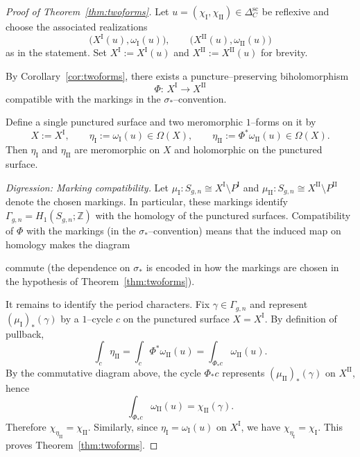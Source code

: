 \documentclass[a4paper,12pt]{amsart}
\newcommand{\Z}{\mathbb{Z}}
\theoremstyle{plain}
\theoremstyle{definition}
\begin{document}
\begin{proof}[Proof of Theorem~\ref{thm:twoforms}]
Let $u=(\chi_{\mathrm{I}},\chi_{\mathrm{II}})\in\Delta_C^{\mathrm{sc}}$ be reflexive and choose the associated realizations
\[
\bigl(X^{\mathrm{I}}(u),\omega_{\mathrm{I}}(u)\bigr),\qquad
\bigl(X^{\mathrm{II}}(u),\omega_{\mathrm{II}}(u)\bigr)
\]
as in the statement. Set $X^{\mathrm{I}}:=X^{\mathrm{I}}(u)$ and $X^{\mathrm{II}}:=X^{\mathrm{II}}(u)$ for brevity.

By Corollary~\ref{cor:twoforms},  there exists a puncture--preserving biholomorphism
\[
\Phi:\,X^{\mathrm{I}}\longrightarrow X^{\mathrm{II}}
\]
compatible with the markings in the $\sigma_\ast$--convention.


Define a single punctured surface and two meromorphic $1$--forms on it by
\[
X:=X^{\mathrm{I}},\qquad
\eta_{\mathrm{I}}:=\omega_{\mathrm{I}}(u)\in\Omega(X),\qquad
\eta_{\mathrm{II}}:=\Phi^\ast\omega_{\mathrm{II}}(u)\in\Omega(X).
\]
Then $\eta_{\mathrm{I}}$ and $\eta_{\mathrm{II}}$ are meromorphic on $X$ and holomorphic on the punctured surface.

\medskip
\noindent\textit{Digression: Marking compatibility.}
Let $\mu_{\mathrm{I}}:S_{g,n}\cong X^{\mathrm{I}}\setminus P^{\mathrm{I}}$ and
$\mu_{\mathrm{II}}:S_{g,n}\cong X^{\mathrm{II}}\setminus P^{\mathrm{II}}$ denote the chosen markings.
In particular, these markings identify $\Gamma_{g,n}=H_1(S_{g,n};\Z)$ with the homology of the punctured surfaces.
Compatibility of $\Phi$ with the markings (in the $\sigma_\ast$--convention) means that the induced map on homology makes the
diagram
\begin{center}
\end{center}
commute (the dependence on $\sigma_\ast$ is encoded in how the markings are chosen in the hypothesis of
Theorem~\ref{thm:twoforms}).

It remains to identify the period characters.
Fix $\gamma\in\Gamma_{g,n}$ and represent $(\mu_{\mathrm{I}})_\ast(\gamma)$ by a $1$--cycle $c$ on the punctured surface
$X=X^{\mathrm{I}}$.
By definition of pullback,
\[
\int_c \eta_{\mathrm{II}}
=
\int_c \Phi^\ast\omega_{\mathrm{II}}(u)
=
\int_{\Phi_\ast c}\omega_{\mathrm{II}}(u).
\]
By the commutative diagram above, the cycle $\Phi_\ast c$ represents $(\mu_{\mathrm{II}})_\ast(\gamma)$ on
$X^{\mathrm{II}}$, hence
\[
\int_{\Phi_\ast c}\omega_{\mathrm{II}}(u)=\chi_{\mathrm{II}}(\gamma).
\]
Therefore $\chi_{\eta_{\mathrm{II}}}=\chi_{\mathrm{II}}$.
Similarly, since $\eta_{\mathrm{I}}=\omega_{\mathrm{I}}(u)$ on $X^{\mathrm{I}}$, we have $\chi_{\eta_{\mathrm{I}}}=\chi_{\mathrm{I}}$.
This proves Theorem~\ref{thm:twoforms}.
\end{proof}
\end{document}
